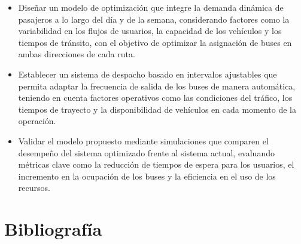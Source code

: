 \documentclass[preprint,11pt]{elsarticle}
\begin{document}
\begin{itemize}
    \item Diseñar un modelo de optimización que integre la demanda dinámica de pasajeros a lo largo del día y de la semana, considerando factores como la variabilidad en los flujos de usuarios, la capacidad de los vehículos y los tiempos de tránsito, con el objetivo de optimizar la asignación de buses en ambas direcciones de cada ruta.
    \item Establecer un sistema de despacho basado en intervalos ajustables que permita adaptar la frecuencia de salida de los buses de manera automática, teniendo en cuenta factores operativos como las condiciones del tráfico, los tiempos de trayecto y la disponibilidad de vehículos en cada momento de la operación.
    \item Validar el modelo propuesto mediante simulaciones que comparen el desempeño del sistema optimizado frente al sistema actual, evaluando métricas clave como la reducción de tiempos de espera para los usuarios, el incremento en la ocupación de los buses y la eficiencia en el uso de los recursos.
\end{itemize}

\section{Bibliografía}
\printbibliography %
\end{document}
